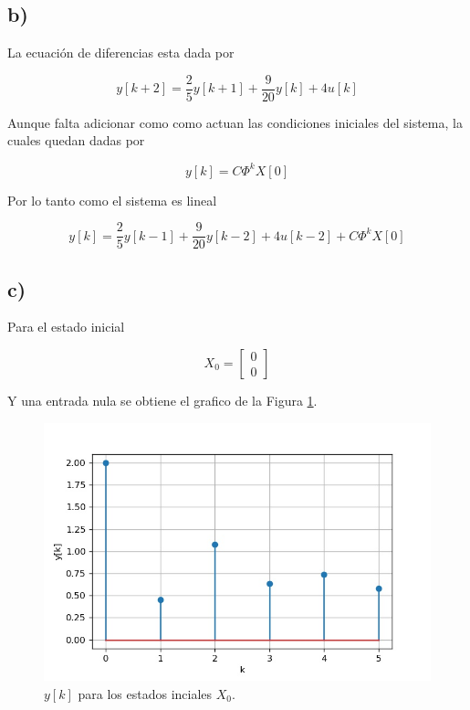 \documentclass[11pt,a4paper]{article}
\begin{document}
    \subsection*{b)}

    La ecuación de diferencias esta dada por 

    \begin{equation}
        y[k+2] = \frac{2}{5}y[k+1] + \frac{9}{20}y[k] + 4u[k]
    \end{equation}

    Aunque falta adicionar como como actuan las condiciones iniciales del sistema, la cuales quedan dadas por 

    \begin{equation}
        y[k] = C\Phi^kX[0]
    \end{equation}

    Por lo tanto como el sistema es lineal

    \begin{equation}
        y[k] = \frac{2}{5}y[k-1] + \frac{9}{20}y[k-2] + 4u[k-2] + C\Phi^k X[0]
    \end{equation}

    \subsection*{c)}

    Para el estado inicial 

    \begin{equation}
        X_0 = 
        \begin{bmatrix}
            0 \\ 0    
        \end{bmatrix}
    \end{equation}

    Y una entrada nula se obtiene el grafico de la Figura \ref{fig:1-b}.

    \begin{figure}
        \centering
        \includegraphics[width=.5\textwidth]{Img/1-b.jpg}
        \caption{$y[k]$ para los estados inciales $X_0$.}
        \label{fig:1-b}
    \end{figure}
\end{document}
